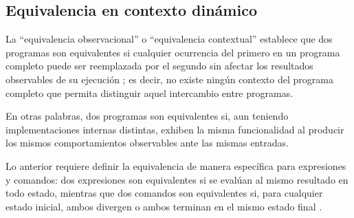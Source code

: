 \subsection{Equivalencia en contexto dinámico }

La \enquote{equivalencia observacional} o \enquote{equivalencia contextual} establece que dos programas son equivalentes si cualquier ocurrencia del primero en un programa completo puede ser reemplazada por el segundo sin afectar los resultados observables de su ejecución \cite{Pitts2002Operational}; es decir, no existe ningún contexto del programa completo que permita distinguir aquel  intercambio entre programas.


En otras palabras, dos programas son equivalentes si, aun teniendo implementaciones internas distintas, exhiben la misma funcionalidad al producir los mismos comportamientos observables ante las mismas entradas.


Lo anterior requiere definir la equivalencia de manera específica para expresiones y comandos: dos expresiones son equivalentes si se evalúan al mismo resultado en todo estado, mientras que dos comandos son equivalentes si, para cualquier estado inicial, ambos divergen o ambos terminan en el mismo estado final \cite{Pierce:SF2}.